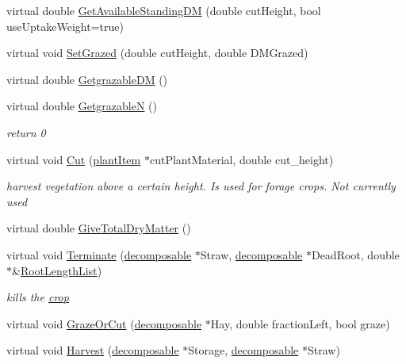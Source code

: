 \begin{DoxyCompactItemize}
\item 
virtual double \hyperlink{classcrop_ryegrass_a4bf3812ba96c183f5ff8b671d8ee9d85}{GetAvailableStandingDM} (double cutHeight, bool useUptakeWeight=true)
\item 
virtual void \hyperlink{classcrop_ryegrass_a64930de42e02d7aa99becc169c5a8b19}{SetGrazed} (double cutHeight, double DMGrazed)
\item 
virtual double \hyperlink{classcrop_ryegrass_ae0b4f4270bb1cc5d47751bb999816ad7}{GetgrazableDM} ()
\item 
virtual double \hyperlink{classcrop_ryegrass_a158a56a14a1b65c246b9dc87b736feb0}{GetgrazableN} ()
\begin{DoxyCompactList}\small\item\em return 0 \item\end{DoxyCompactList}\item 
virtual void \hyperlink{classcrop_ryegrass_a35e69a6dea6f87f1adb3060e456290ba}{Cut} (\hyperlink{classplant_item}{plantItem} $\ast$cutPlantMaterial, double cut\_\-height)
\begin{DoxyCompactList}\small\item\em harvest vegetation above a certain height. Is used for forage crops. Not currently used \item\end{DoxyCompactList}\item 
virtual double \hyperlink{classcrop_ryegrass_a1e6a5963c054701247f58d1d44972212}{GiveTotalDryMatter} ()
\item 
virtual void \hyperlink{classcrop_ryegrass_a9a97cb45a3f91020ccf85f6fabcc532a}{Terminate} (\hyperlink{classdecomposable}{decomposable} $\ast$Straw, \hyperlink{classdecomposable}{decomposable} $\ast$DeadRoot, double $\ast$\&\hyperlink{classcrop_ad629acdfd462323490f91ad3ce9a7b59}{RootLengthList})
\begin{DoxyCompactList}\small\item\em kills the \hyperlink{classcrop}{crop} \item\end{DoxyCompactList}\item 
virtual void \hyperlink{classcrop_ryegrass_ad72a3a888551fd165455cf75bd59cbf1}{GrazeOrCut} (\hyperlink{classdecomposable}{decomposable} $\ast$Hay, double fractionLeft, bool graze)
\item 
virtual void \hyperlink{classcrop_ryegrass_a33a0c70645ce03afc49541e8d3f4919b}{Harvest} (\hyperlink{classdecomposable}{decomposable} $\ast$Storage, \hyperlink{classdecomposable}{decomposable} $\ast$Straw)

\end{DoxyCompactItemize}
